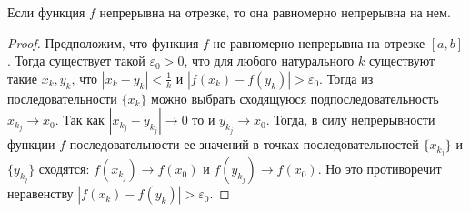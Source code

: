 \begin{theorem}
	Если функция \(f\) непрерывна на отрезке, то она равномерно непрерывна на нем.
\end{theorem}
\begin{proof}
	Предположим, что функция \(f\) не равномерно непрерывна на отрезке \([a,b]\). Тогда существует такой \(\varepsilon_0>0\), что для любого  натурального \(k\) существуют такие \(x_k, y_k\), что \(|x_k-y_k| < \tfrac{1}{k}\) и \(|f(x_k) - f(y_k)|>\varepsilon_0\). Тогда из последовательности \(\{x_k\}\) можно выбрать сходящуюся подпоследовательность \(x_{k_j}\to x_0\). Так как \(|x_{k_j}-y_{k_j}|\to0\) то и \(y_{k_j}\to x_0\). Тогда, в силу непрерывности функции \(f\) последовательности ее значений в точках последовательностей \(\{x_{k_j}\}\) и \(\{y_{k_j}\}\) сходятся: \(f(x_{k_j})\to f(x_0)\) и \(f(y_{k_j})\to f(x_0)\). Но это противоречит неравенству \(|f(x_k) - f(y_k)|>\varepsilon_0\).
\end{proof}